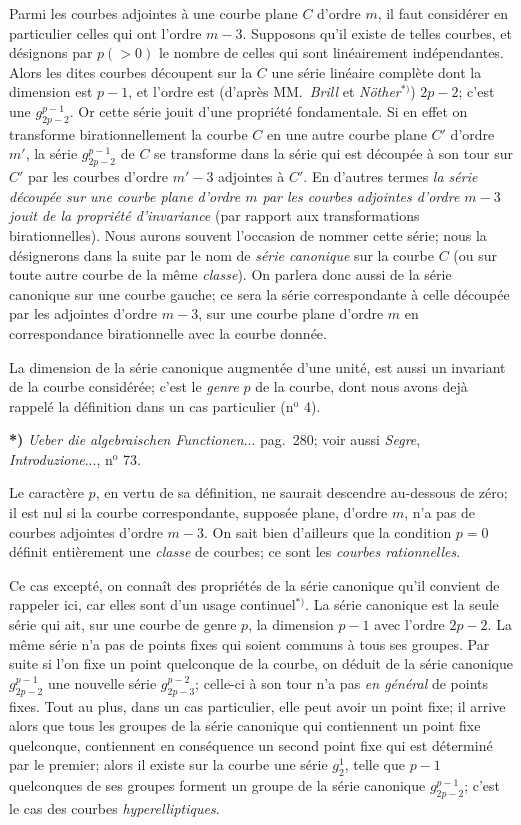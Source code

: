 \documentclass{article}
\begin{document}
Parmi les courbes adjointes à une courbe plane $C$ d'ordre $m$, il faut considérer en particulier celles qui ont l'ordre $m - 3$. Supposons qu'il existe de telles courbes, et désignons par $p(>0)$ le nombre de celles qui sont linéairement indépendantes. Alors les dites courbes découpent sur la $C$ une série linéaire complète dont la dimension est $p - 1$, et l'ordre est (d'après MM.\ \emph{Brill} et \emph{Nöther}${}^{*)}$) $2p - 2$; c'est une $g_{2p-2}^{p-1}$. Or cette série jouit d'une propriété fondamentale. Si en effet on transforme birationnellement la courbe $C$ en une autre courbe plane $C'$ d'ordre $m'$, la série $g_{2p-2}^{p-1}$ de $C$ se transforme dans la série qui est découpée à son tour sur $C'$ par les courbes d'ordre $m' - 3$ adjointes à $C'$. En d'autres termes \emph{la série découpée sur une courbe plane d'ordre $m$ par les courbes adjointes d'ordre $m - 3$ jouit de la propriété d'invariance} (par rapport aux transformations birationnelles). Nous aurons souvent l'occasion de nommer cette série; nous la désignerons dans la suite par le nom de \emph{série canonique} sur la courbe $C$ (ou sur toute autre courbe de la même \emph{classe}). On parlera donc aussi de la série canonique sur une courbe gauche; ce sera la série correspondante à celle découpée par les adjointes d'ordre $m - 3$, sur une courbe plane d'ordre $m$ en correspondance birationnelle avec la courbe donnée.

La dimension de la série canonique augmentée d'une unité, est aussi un invariant de la courbe considérée; c'est le \emph{genre} $p$ de la courbe, dont nous avons dejà rappelé la définition dans un cas particulier (n${}^{\text{o}}$ 4).

\textbf{*)} \emph{Ueber die algebraischen Functionen}... pag.\ 280; voir aussi \emph{Segre}, \emph{Introduzione}..., n${}^{\text{o}}$ 73.


Le caractère $p$, en vertu de sa définition, ne saurait descendre au-dessous de zéro; il est nul si la courbe correspondante, supposée plane, d'ordre $m$, n'a pas de courbes adjointes d'ordre $m - 3$. On sait bien d'ailleurs que la condition $p = 0$ définit entièrement une \emph{classe} de courbes; ce sont les \emph{courbes rationnelles}.

Ce cas excepté, on connaît des propriétés de la série canonique qu'il convient de rappeler ici, car elles sont d'un usage continuel${}^{*)}$. La série canonique est la seule série qui ait, sur une courbe de genre $p$, la dimension $p - 1$ avec l'ordre $2p - 2$. La même série n'a pas de points fixes qui soient communs à tous ses groupes. Par suite si l'on fixe un point quelconque de la courbe, on déduit de la série canonique $g_{2p-2}^{p-1}$ une nouvelle série $g_{2p-3}^{p-2}$; celle-ci à son tour n'a pas \emph{en général} de points fixes. Tout au plus, dans un cas particulier, elle peut avoir un point fixe; il arrive alors que tous les groupes de la série canonique qui contiennent un point fixe quelconque, contiennent en conséquence un second point fixe qui est déterminé par le premier; alors il existe sur la courbe une série $g_{2}^{1}$, telle que $p - 1$ quelconques de ses groupes forment un groupe de la série canonique $g_{2p-2}^{p-1}$; c'est le cas des courbes \emph{hyperelliptiques}.
\end{document}
